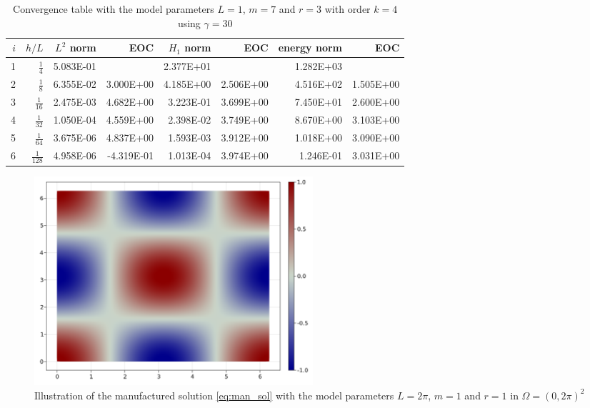\begin{table}
  \caption{\label{tab:ex1_order:c}Convergence table with the model parameters $L=1$, $m=7$ and $r=3$ with order $k=4$ using $ \gamma = 30$ }
  \begin{tabular}{rrrrrrrr}
    \hline\hline
    $i$&\textbf{$h/{L} $} & \textbf{$L^2$ norm} & \textbf{EOC} & \textbf{$H_1$ norm} & \textbf{EOC} & \textbf{energy norm} & \textbf{EOC} \\\hline
    1&$\frac{1}{4}$ & 5.083E-01 &  & 2.377E+01 &  & 1.282E+03 &  \\
    2&$\frac{1}{8}$ & 6.355E-02 & 3.000E+00 & 4.185E+00 & 2.506E+00 & 4.516E+02 & 1.505E+00 \\
    3&$\frac{1}{16}$ & 2.475E-03 & 4.682E+00 & 3.223E-01 & 3.699E+00 & 7.450E+01 & 2.600E+00 \\
    4&$\frac{1}{32}$ & 1.050E-04 & 4.559E+00 & 2.398E-02 & 3.749E+00 & 8.670E+00 & 3.103E+00 \\
    5&$\frac{1}{64}$ & 3.675E-06 & 4.837E+00 & 1.593E-03 & 3.912E+00 & 1.018E+00 & 3.090E+00 \\
    6&$\frac{1}{128}$ & 4.958E-06 & -4.319E-01 & 1.013E-04 & 3.974E+00 & 1.246E-01 & 3.031E+00 \\\hline\hline
  \end{tabular}
\end{table}

\newpage

\begin{figure}[tbh!]
    \centering
    \includegraphics[width=0.5\textwidth]{figures/model/l_6.28_m_1_r_1n_100_sol.png}
    \caption{Illustration of the manufactured solution \eqref{eq:man_sol} with the model parameters $L=2\pi$, $m=1$ and $r=1$ in $\Omega = (0,2\pi)^2$}
    \label{fig:sol_l2pi_m1_r1}
\end{figure}


